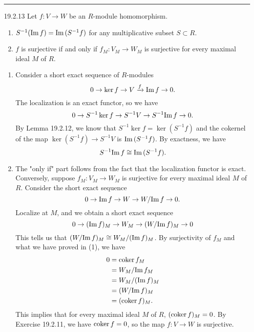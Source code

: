 \documentclass[a4paper, 12pt]{article}
\begin{document}
\noindent\rule{7in}{2.8pt}
\begin{problem}{19.2.13}
Let \(f:V\rightarrow W\) be an \(R\)-module homomorphism. 
\begin{enumerate}[(1)]
\item \(S^{-1}(\text{Im}\, f)=\text{Im}\,(S^{-1}f)\) for any multiplicative subset \(S\subset R\). 
\item \(f\) is surjective if and only if \(f_M:V_M\rightarrow W_M\) is surjective for every maximal ideal \(M\) of \(R\).
\end{enumerate}
\end{problem}
\begin{solution}
\begin{enumerate}[(1)]
\item Consider a short exact sequence of \(R\)-modules 
\[0\rightarrow \ker f\rightarrow V\xrightarrow{f}\text{Im}\, f\rightarrow 0.\]
The localization is an exact functor, so we have 
\[0\rightarrow S^{-1}\ker f\rightarrow S^{-1}V\rightarrow S^{-1}\text{Im}\, f\rightarrow 0.\]
By Lemma 19.2.12, we know that \(S^{-1}\ker f=\ker (S^{-1}f)\) and the cokernel of the map \(\ker(S^{-1}f)\rightarrow S^{-1}V\) is \(\text{Im}\, (S^{-1}f)\). By exactness, we have 
\[S^{-1}\text{Im}\, f\cong \text{Im}\, (S^{-1}f).\]
\item The "only if" part follows from the fact that the localization functor is exact. Conversely, suppose \(f_M:V_M\rightarrow W_M\) is surjective for every maximal ideal \(M\) of \(R\). Consider the short exact sequence 
\[0\rightarrow \text{Im}\, f\rightarrow W\rightarrow W/\text{Im}\, f\rightarrow 0.\]
Localize at \(M\), and we obtain a short exact sequence
\[0\rightarrow (\text{Im}\, f)_M\rightarrow W_M\rightarrow (W/\text{Im}\, f)_M\rightarrow 0\]
This tells us that \((W/\text{Im}\, f)_M\cong W_M/(\text{Im}\, f)_M\). By surjectivity of \(f_M\) and what we have proved in (1), we have 
\begin{align*}
    0&=\text{coker}\, f_M\\ 
     &=W_M/\text{Im}\, f_M\\
     &=W_M/(\text{Im}\, f)_M\\ 
     &=(W/\text{Im}\, f)_M\\
     &=(\text{coker}\, f)_M.
\end{align*}
This implies that for every maximal ideal \(M\) of \(R\), \((\text{coker}\, f)_M=0\). By Exercise 19.2.11, we have \(\text{coker}\, f=0\), so the map \(f:V\rightarrow W\) is surjective.
\end{enumerate}
\end{solution}
\end{document}
